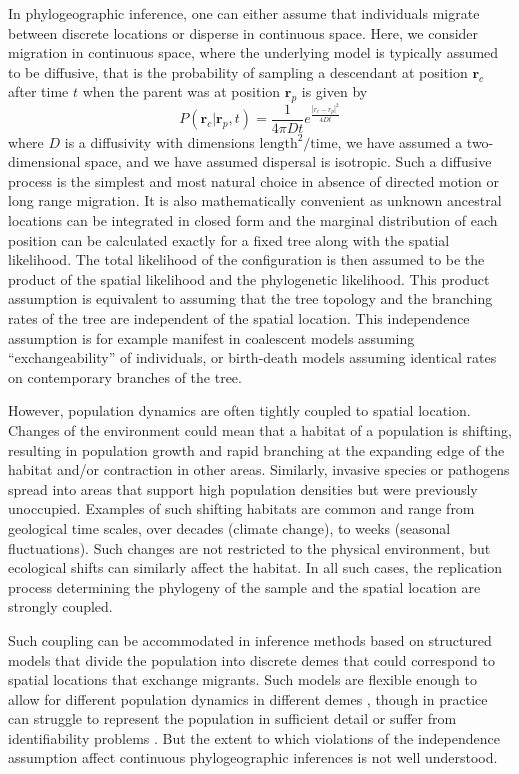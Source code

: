\documentclass[aps,rmp, twocolumn]{revtex4}
\newcommand{\rvec}{\mathbf{r}}
\begin{document}
In phylogeographic inference, one can either assume that individuals migrate between discrete locations or disperse in continuous space.
Here, we consider migration in continuous space, where the underlying model is typically assumed to be diffusive, that is the probability of sampling a descendant at position $\rvec_c$ after time $t$ when the parent was at position $\rvec_p$ is given by
\begin{equation}
    P(\rvec_c| \rvec_p, t) = \frac{1}{4\pi D t}e^{\frac{|r_c - r_p|^2}{4Dt}}
\end{equation}
where $D$ is a diffusivity with dimensions $\mathrm{length}^2/\mathrm{time}$, we have assumed a two-dimensional space, and we have assumed dispersal is isotropic.
Such a diffusive process is the simplest and most natural choice in absence of directed motion or long range migration.
It is also mathematically convenient as unknown ancestral locations can be integrated in closed form and the marginal distribution of each position can be calculated exactly for a fixed tree along with the spatial likelihood.
The total likelihood of the configuration is then assumed to be the product of the spatial likelihood and the phylogenetic likelihood.
This product assumption is equivalent to assuming that the tree topology and the branching rates of the tree are independent of the spatial location.
This independence assumption is for example manifest in coalescent models assuming ``exchangeability'' of individuals, or birth-death models assuming identical rates on contemporary branches of the tree.

However, population dynamics are often tightly coupled to spatial location.
Changes of the environment could mean that a habitat of a population is shifting, resulting in population growth and rapid branching at the expanding edge of the habitat and/or contraction in other areas.
Similarly, invasive species or pathogens spread into areas that support high population densities but were previously unoccupied.
Examples of such shifting habitats are common and range from geological time scales, over decades (climate change), to weeks (seasonal fluctuations).
Such changes are not restricted to the physical environment, but ecological shifts can similarly affect the habitat.
In all such cases, the replication process determining the phylogeny of the sample and the spatial location are strongly coupled.

Such coupling can be accommodated in inference methods based on structured models that divide the population into discrete demes that could correspond to spatial locations that exchange migrants.
Such models are flexible enough to allow for different population dynamics in different demes \citep{vaughan_efficient_2014}, though in practice can struggle to represent the population in sufficient detail or suffer from identifiability problems \citep{layan_impact_2023}.
But the extent to which violations of the independence assumption affect continuous phylogeographic inferences is not well understood.
\end{document}
